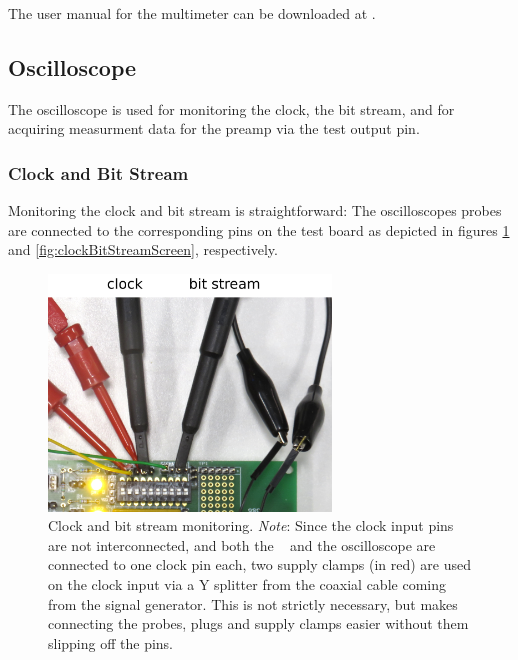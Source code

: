 The    user   manual    for   the    multimeter   can    be   downloaded    at
\cite{ref:34460:userGuide}.


\subsection{Oscilloscope}
\label{subsec:oscilloscope}



The oscilloscope  is used for  monitoring the clock,  the bit stream,  and for
acquiring measurment data for the preamp via the test output pin.

\subsubsection{Clock and Bit Stream}
\label{subsubsec:clockBitstream}

Monitoring  the clock  and  bit stream  is straightforward: The  oscilloscopes
probes are connected  to the corresponding pins on the  test board as depicted
in figures  \ref{fig:clockBitStreamProbes} and \ref{fig:clockBitStreamScreen},
respectively.

\begin{figure}
    \centering
    \includegraphics[width=0.67\textwidth]{images/expSetup/testBoardOsciBitStreamClkProbes.jpeg}
    \caption{%
        Clock and  bit stream  monitoring. \emph{Note}: Since the  clock input
        pins are not interconnected, and both the \raspi~ and the oscilloscope
        are connected  to one clock pin  each, two supply clamps  (in red) are
        used on the clock input via a Y splitter from the coaxial cable coming
        from the signal  generator. This is not strictly  necessary, but makes
        connecting the  probes, plugs  and supply  clamps easier  without them
        slipping off the pins.%
    }
    \label{fig:clockBitStreamProbes}
\end{figure}


